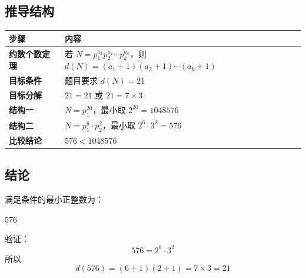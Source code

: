 \documentclass[11pt,a4paper]{ctexart}
\begin{document}
\begin{summarybox}

\subsection*{推导结构}

\begin{center}
\begin{tabular}{@{}>{\sffamily\bfseries}p{3.2cm} p{10.8cm}@{}}
\toprule
\textbf{步骤} & \textbf{内容} \\
\midrule
约数个数定理 & 若 $N=p_1^{a_1}p_2^{a_2}\cdots p_k^{a_k}$，则 $d(N)=(a_1+1)(a_2+1)\cdots(a_k+1)$ \\
目标条件 & 题目要求 $d(N)=21$ \\
目标分解 & $21=21$ 或 $21=7\times3$ \\
结构一 & $N=p_1^{20}$，最小取 $2^{20}=1048576$ \\
结构二 & $N=p_1^6\cdot p_2^2$，最小取 $2^6\cdot3^2=576$ \\
比较结论 & $576<1048576$ \\
\bottomrule
\end{tabular}
\end{center}

\vspace{1em}

\subsection*{结论}

满足条件的最小正整数为：

\begin{center}
\begin{tcolorbox}[
  enhanced, colframe=accent!80, colback=accent!10,
  sharp corners, boxrule=1.5pt, width=6cm, center,
]
  {\color{maincolor}\sffamily\bfseries\LARGE $576$}
\end{tcolorbox}
\end{center}

验证：
\[
  576 = 2^6 \cdot 3^2
\]
所以
\[
  d(576)=(6+1)(2+1)=7\times3=21
\]

\end{summarybox}
\end{document}
